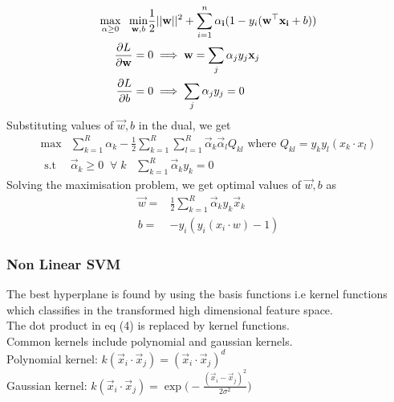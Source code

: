 \documentclass[12pt,letterpaper, onecolumn]{exam}
\begin{document}
\begin{equation}
\begin{aligned}
\max_{\vec{\alpha}\geq 0} \hspace{2mm} \min_{\vec{w},b} &\frac{1}{2}||\vec{w}||^2 + \sum_{i = 1}^n \vec{\alpha_i}(1-y_i(\vec{w}^\top \vec{x_i}+b))\\
\frac{\partial L}{\partial \vec{w}} ={}& 0 \implies  \vec{w} = \sum_{j} \vec{\alpha}_j y_j \vec{x}_j\\
\frac{\partial L}{\partial b} ={}& 0 \implies \sum_{j} \vec{\alpha}_j y_j=0
\end{aligned}
\end{equation}
Substituting values of $\vec{w},b$ in the dual, we get
\begin{equation}
\begin{aligned}
\max & \sum_{k=1}^R \alpha_k - \frac{1}{2}\sum_{k=1}^R \sum_{l=1}^R \vec{\alpha}_k \vec{\alpha}_l Q_{kl} \text{ where } Q_{kl} = y_k y_l(x_k \cdot x_l)\\ 
\textrm{ s.t    }& \vec{\alpha}_k \geq 0 \; \; \forall \; k \; \; \; \sum_{k=1}^R \vec{\alpha}_k y_k = 0
\end{aligned}
\end{equation}
Solving the maximisation problem, we get optimal values of $\vec{w},b$ as
\begin{align}
\vec{w} = {}& \frac{1}{2} \sum_{k=1}^R \vec{\alpha}_k y_k \vec{x}_k\\
b = {}& -y_i(y_i(x_i \cdot w)-1)
\end{align}
\subsubsection*{Non Linear SVM}
The best hyperplane is found by using the basis functions i.e kernel functions which classifies in the transformed high dimensional feature space.\\ The dot product in eq (4) is replaced by kernel functions.\\
Common kernels include polynomial and gaussian kernels.\\
Polynomial kernel: $k(\vec{x}_i \cdot \vec{x}_j) = (\vec{x}_i \cdot \vec{x}_j)^d$\\
Gaussian kernel: $k(\vec{x}_i \cdot \vec{x}_j) = \exp \big( -\frac{(\vec{x}_i - \vec{x}_j)^2}{2 \sigma^2} \big)$\\
\end{document}

